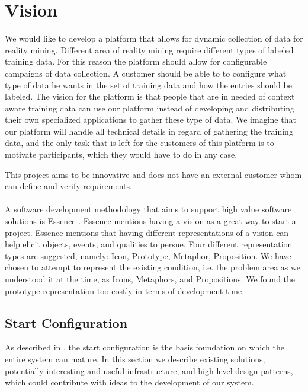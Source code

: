 
\section{Vision}
\label{sec:vision}

We would like to develop a platform that allows for dynamic collection of data for reality mining. Different area of reality mining require different types of labeled training data. For this reason the platform should allow for configurable campaigns of data collection. A customer should be able to to configure what type of data he wants in the set of training data and how the entries should be labeled. The vision for the platform is that people that are in needed of context aware training data can use our platform instead of developing and distributing their own specialized applications to gather these type of data. We imagine that our platform will handle all technical details in regard of gathering the training data, and the only task that is left for the customers of this platform is to motivate participants, which they would have to do in any case.


This project aims to be innovative and does not have an external customer whom can define and verify requirements. 
\\\\
A software development methodology that aims to support high value software solutions is Essence \parencite{essence_book}. Essence mentions having a vision as a great way to start a project. Essence mentions that having different representations of a vision can help elicit objects, events, and qualities to persue. Four different representation types are suggested, namely: Icon, Prototype, Metaphor, Proposition. We have chosen to attempt to represent the existing condition, i.e. the problem area as we understood it at the time, as Icons, Metaphors, and Propositions. We found the prototype representation too costly in terms of development time. 

\subsection{Start Configuration}
\label{sub:start_configuration}

As described in , the start configuration is the basis foundation on which the entire system can mature. In this section we describe existing solutions, potentially interesting and useful infrastructure, and high level design patterns, which could contribute with ideas to the development of our system.

